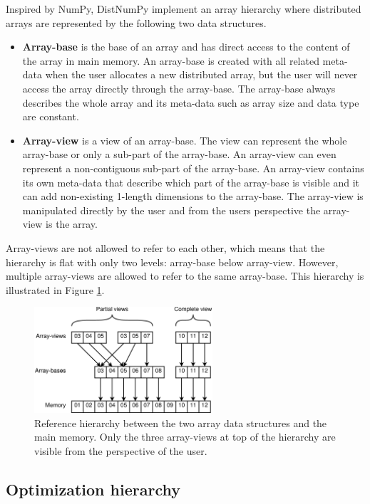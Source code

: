 \documentclass[10pt]{article}
\begin{document}
Inspired by NumPy, DistNumPy implement an array hierarchy where distributed arrays are represented by the following two data structures.
\begin{itemize}
\item \textbf{Array-base} is the base of an array and has direct access to the content of the array in main memory. An array-base is created with all related meta-data when the user allocates a new distributed array, but the user will never access the array directly through the array-base. The array-base always describes the whole array and its meta-data such as array size and data type are constant.
\item \textbf{Array-view} is a view of an array-base. The view can represent the whole array-base or only a sub-part of the array-base. An array-view can even represent a non-contiguous sub-part of the array-base. An array-view contains its own meta-data that describe which part of the array-base is visible and it can add non-existing 1-length dimensions to the array-base. The array-view is manipulated directly by the user and from the users perspective the array-view is the array.
\end{itemize}
Array-views are not allowed to refer to each other, which means that the hierarchy is flat with only two levels: array-base below array-view. However, multiple array-views are allowed to refer to the same array-base. This hierarchy is illustrated in Figure \ref{fig:views}. 

\begin{figure}
 \centering
 \includegraphics[width=250px]{gfx/views}
 \caption{Reference hierarchy between the two array data structures and the main memory. Only the three array-views at top of the hierarchy are visible from the perspective of the user.}
 \label{fig:views}
\end{figure}

\subsection{Optimization hierarchy}
\end{document}
